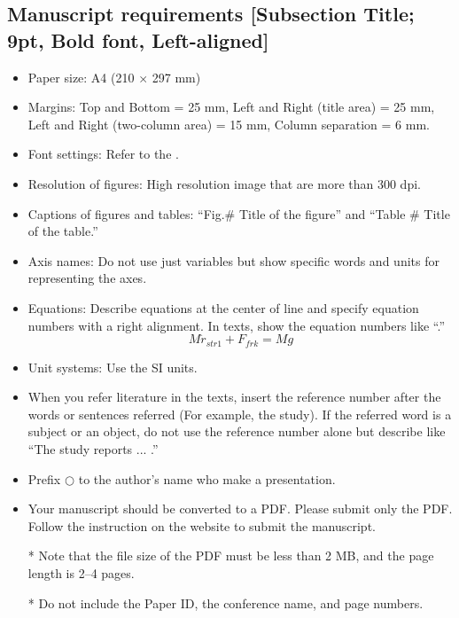 \documentclass[a4paper]{article}
\begin{document}
\subsection{Manuscript requirements [Subsection Title; 9pt, Bold font, Left-aligned]}%
\begin{itemize}
	\item Paper size: A4 (210 $\times$ 297 mm)
	\item Margins: Top and Bottom = 25 mm, Left and Right (title area) = 25 mm, Left and Right (two-column area) = 15 mm, Column separation = 6 mm.
	\item Font settings: Refer to the .
	\item Resolution of figures: High resolution image that are more than 300 dpi.
	\item Captions of figures and tables: “Fig.\# Title of the figure” and “Table \# Title of the table.”
    \item Axis names: Do not use just variables but show specific words and units for representing the axes.
	\item Equations: Describe equations at the center of line and specify equation numbers with a right alignment. In texts, show the equation numbers like “.”
	\begin{equation}
		M\ddot{r}_{str1} + F_{frk} = Mg
		\label{eqn: eq1}
	\end{equation}

	\item Unit systems: Use the SI units.
	\item When you refer literature in the texts,  insert the reference number after the words or sentences referred (For example, the study\cite{Shinjuku98}). If the referred word is a subject or an object, do not use the reference number alone but describe like “The study\cite{Shinjuku98} reports ... .”
	\item Prefix $\bigcirc$ to the author's name who make a presentation.
	\item Your manuscript should be converted to a PDF.  Please submit only the PDF. Follow the instruction on the website to submit the manuscript. 
	\item[] 
	\item[*] Note that the file size of the PDF must be less than 2 MB, and the page length is 2--4 pages. 
	\item[*] Do not include the Paper ID, the conference name, and page numbers. 
\end{itemize}
\end{document}
